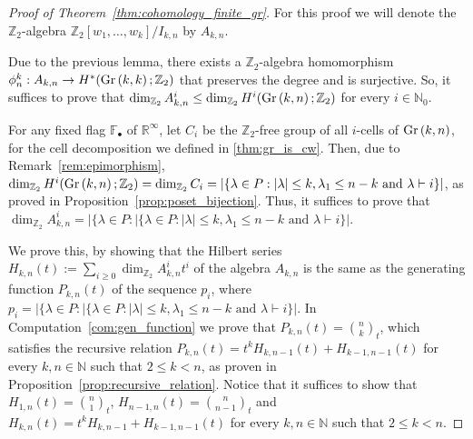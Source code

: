 \begin{proof}[Proof of Theorem~\ref{thm:cohomology_finite_gr}] For this proof we will denote the $\mathbb{Z}_2$-algebra $\mathbb{Z}_2[w_1,\ldots,w_k]/I_{k,n}$ by $A_{k,n}$.

Due to the previous lemma, there exists a $\mathbb{Z}_2$-algebra homomorphism $\phi_n^k:A_{k,n}\to H^*(\Gr{k}{k};\mathbb{Z}_2)$ that preserves the degree and is surjective. So, it suffices to prove that $\dim_{\mathbb{Z}_2}A_{k,n}^i\leq\dim_{\mathbb{Z}_2}H^i(\Gr{k}{n};\mathbb{Z}_2)$ for every $i\in\mathbb{N}_0$.

For any fixed flag $\mathbb{F}_{\bullet}$ of $\mathbb{R}^{\infty}$, let $C_i$ be the $\mathbb{Z}_2$-free group of all $i$-cells of $\Gr{k}{n}$, for the cell decomposition we defined in \ref{thm:gr_is_cw}. Then, due to Remark~\ref{rem:epimorphism},  $\dim_{\mathbb{Z}_2}H^i(\Gr{k}{n};\mathbb{Z}_2)=\dim_{\mathbb{Z}_2}C_i=|\{\lambda\in P:|\lambda|\leq k,\lambda_1\leq n-k\text{ and }\lambda\vdash i\}|$, as proved in Proposition~\ref{prop:poset_bijection}. Thus, it suffices to prove that $\dim_{\mathbb{Z}_2}A_{k,n}^i=|\{\lambda\in P:|\{\lambda\in P:|\lambda|\leq k,\lambda_1\leq n-k\text{ and }\lambda\vdash i\}|$.

We prove this, by showing that the Hilbert series $H_{k,n}(t):=\sum_{i\geq0}\dim_{\mathbb{Z}_2}A_{k,n}^it^i$ of the algebra $A_{k,n}$ is the same as the generating function $P_{k,n}(t)$ of the sequence $p_i$, where $p_i=|\{\lambda\in P:|\{\lambda\in P:|\lambda|\leq k,\lambda_1\leq n-k\text{ and }\lambda\vdash i\}|$. In Computation~\ref{com:gen_function} we prove that $P_{k,n}(t)=\binom{n}{k}_t$, which satisfies the recursive relation $P_{k,n}(t)=t^kH_{k,n-1}(t)+H_{k-1,n-1}(t)$ for every $k,n\in\mathbb{N}$ such that $2\leq k<n$, as proven in Proposition~\ref{prop:recursive_relation}. Notice that it suffices to show that $H_{1,n}(t)=\binom{n}{1}_t$, $H_{n-1,n}(t)=\binom{n}{n-1}_t$ and $H_{k,n}(t)=t^kH_{k,n-1}+H_{k-1,n-1}(t)$ for every $k,n\in\mathbb{N}$ such that $2\leq k<n$.
\end{proof}


